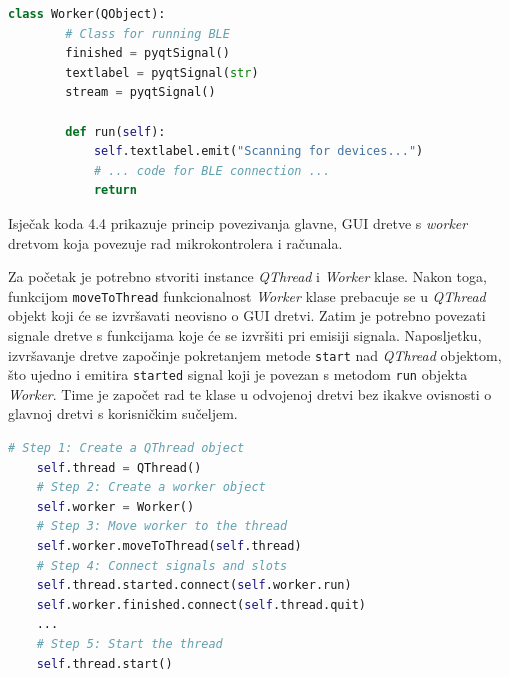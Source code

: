 \begin{lstlisting}[caption={\textit{Worker} klasa}, language=Python]
	class Worker(QObject):
		# Class for running BLE 
		finished = pyqtSignal()
		textlabel = pyqtSignal(str)
		stream = pyqtSignal()
	
		def run(self):
			self.textlabel.emit("Scanning for devices...")
			# ... code for BLE connection ... 
			return
\end{lstlisting}

Isječak koda 4.4 prikazuje princip povezivanja glavne, GUI dretve s \textit{worker} dretvom koja povezuje rad mikrokontrolera i računala.

Za početak je potrebno stvoriti instance \textit{QThread} i \textit{Worker} klase. Nakon toga, funkcijom \lstinline|moveToThread| funkcionalnost \textit{Worker} klase prebacuje se u \textit{QThread} objekt koji će se izvršavati neovisno o GUI dretvi. Zatim je potrebno povezati signale dretve s funkcijama koje će se izvršiti pri emisiji signala. Naposljetku, izvršavanje dretve započinje pokretanjem metode \lstinline|start| nad \textit{QThread} objektom, što ujedno i emitira \lstinline|started| signal koji je povezan s metodom \lstinline|run| objekta \textit{Worker}. Time je započet rad te klase u odvojenoj dretvi bez ikakve ovisnosti o glavnoj dretvi s korisničkim sučeljem.

\begin{lstlisting}[caption={Povezivanje glavne dretve s \textit{worker} dretvom}, language=Python]
	# Step 1: Create a QThread object
	self.thread = QThread()
	# Step 2: Create a worker object
	self.worker = Worker()
	# Step 3: Move worker to the thread
	self.worker.moveToThread(self.thread)
	# Step 4: Connect signals and slots
	self.thread.started.connect(self.worker.run)
	self.worker.finished.connect(self.thread.quit)
	...
	# Step 5: Start the thread
	self.thread.start()
\end{lstlisting}


\eject